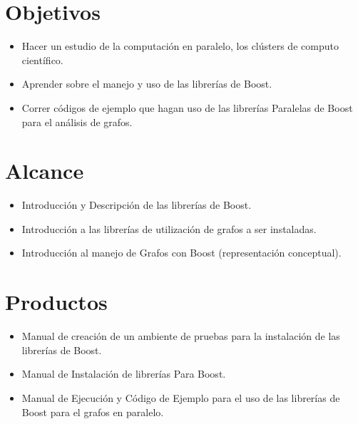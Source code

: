 \newpage

\section{Objetivos}

	\begin{itemize}
		\item Hacer un estudio de la computación en paralelo, los clústers de computo científico. 
		\item Aprender sobre el manejo y uso  de las librerías de Boost.
		\item Correr códigos de ejemplo que hagan uso de las librerías Paralelas de Boost para el análisis de grafos.
	\end{itemize}

\section{Alcance}
	\begin{itemize}
		\item Introducción y Descripción de las librerías de Boost.
		\item Introducción a las librerías de utilización de grafos a ser instaladas.
		\item Introducción al manejo de Grafos con Boost (representación conceptual).
	\end{itemize}

\section{Productos}
	\begin{itemize}
		\item Manual de creación de un ambiente de pruebas para la instalación de las librerías de Boost.
		\item Manual de Instalación de librerías Para Boost.
		\item Manual de Ejecución y Código de Ejemplo para el uso de las librerías de Boost para el grafos en paralelo.	
	\end{itemize}

